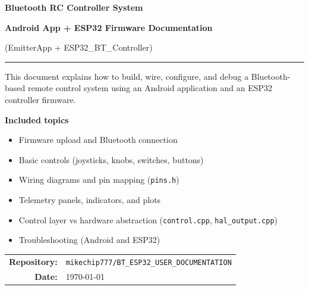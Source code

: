 
    \begin{titlepage}
        \centering

        \vspace*{1.2cm}

        {\Huge\bfseries Bluetooth RC Controller System\par}
        \vspace{0.3cm}
        {\Large\bfseries Android App + ESP32 Firmware Documentation\par}

        \vspace{0.8cm}
        {\large (EmitterApp + ESP32\_BT\_Controller)\par}

        \vspace{1.2cm}
        \rule{0.9\textwidth}{0.8pt}\par
        \vspace{0.6cm}

        {\large
            This document explains how to build, wire, configure, and debug a Bluetooth-based
            remote control system using an Android application and an ESP32 controller firmware.
            \par}

        \vspace{0.9cm}

        \begin{minipage}{0.9\textwidth}
            \raggedright
            \textbf{Included topics}
            \begin{itemize}
                \item Firmware upload and Bluetooth connection
                \item Basic controls (joysticks, knobs, switches, buttons)
                \item Wiring diagrams and pin mapping (\texttt{pins.h})
                \item Telemetry panels, indicators, and plots
                \item Control layer vs hardware abstraction (\texttt{control.cpp}, \texttt{hal\_output.cpp})
                \item Troubleshooting (Android and ESP32)
            \end{itemize}
        \end{minipage}

        \vfill

        \begin{tabular}{@{}rl@{}}
            \textbf{Repository:} & \texttt{mikechip777/BT\_ESP32\_USER\_DOCUMENTATION} \\
            \textbf{Date:} & \today \\
        \end{tabular}

        \vspace*{1.0cm}
    \end{titlepage}